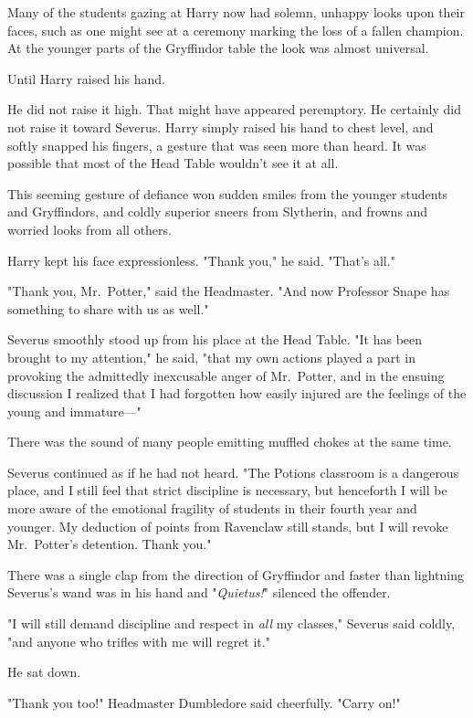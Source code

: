 Many of the students gazing at Harry now had solemn, unhappy looks upon their
faces, such as one might see at a ceremony marking the loss of a fallen
champion. At the younger parts of the Gryffindor table the look was almost
universal.

Until Harry raised his hand.

He did not raise it high. That might have appeared peremptory. He certainly did
not raise it toward Severus. Harry simply raised his hand to chest level, and
softly snapped his fingers, a gesture that was seen more than heard. It was
possible that most of the Head Table wouldn't see it at all.

This seeming gesture of defiance won sudden smiles from the younger students
and Gryffindors, and coldly superior sneers from Slytherin, and frowns and
worried looks from all others.

Harry kept his face expressionless. "Thank you," he said. "That's all."

"Thank you, Mr.~Potter," said the Headmaster. "And now Professor Snape has
something to share with us as well."

Severus smoothly stood up from his place at the Head Table. "It has been
brought to my attention," he said, "that my own actions played a part in
provoking the admittedly inexcusable anger of Mr.~Potter, and in the ensuing
discussion I realized that I had forgotten how easily injured are the feelings
of the young and immature\mbox{---}"

There was the sound of many people emitting muffled chokes at the same time.

Severus continued as if he had not heard. "The Potions classroom is a dangerous
place, and I still feel that strict discipline is necessary, but henceforth I
will be more aware of the{\el} emotional fragility{\el} of students in
their fourth year and younger. My deduction of points from Ravenclaw still
stands, but I will revoke Mr.~Potter's detention. Thank you."

There was a single clap from the direction of Gryffindor and faster than
lightning Severus's wand was in his hand and "\emph{Quietus!}" silenced the
offender.

"I will still demand discipline and respect in \emph{all} my classes," Severus
said coldly, "and anyone who trifles with me will regret it."

He sat down.

"Thank you too!" Headmaster Dumbledore said cheerfully. "Carry on!"

